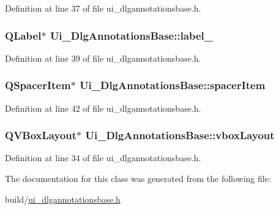 Definition at line 37 of file ui\+\_\+dlgannotationsbase.\+h.

\hypertarget{classUi__DlgAnnotationsBase_a7a9e0688f3997341881b6f05d0cee180}{
\subsubsection[{label\+\_\+2}]{\setlength{\rightskip}{0pt plus 5cm}Q\+Label$\ast$ Ui\+\_\+\+Dlg\+Annotations\+Base\+::label\+\_}}\label{classUi__DlgAnnotationsBase_a7a9e0688f3997341881b6f05d0cee180}


Definition at line 39 of file ui\+\_\+dlgannotationsbase.\+h.

\hypertarget{classUi__DlgAnnotationsBase_a8c085f70a0a6631a9ebec265195f89f0}{
\subsubsection[{spacer\+Item}]{\setlength{\rightskip}{0pt plus 5cm}Q\+Spacer\+Item$\ast$ Ui\+\_\+\+Dlg\+Annotations\+Base\+::spacer\+Item}}\label{classUi__DlgAnnotationsBase_a8c085f70a0a6631a9ebec265195f89f0}


Definition at line 42 of file ui\+\_\+dlgannotationsbase.\+h.

\hypertarget{classUi__DlgAnnotationsBase_a3cca923483f98ed4e4002f2449f2d493}{
\subsubsection[{vbox\+Layout}]{\setlength{\rightskip}{0pt plus 5cm}Q\+V\+Box\+Layout$\ast$ Ui\+\_\+\+Dlg\+Annotations\+Base\+::vbox\+Layout}}\label{classUi__DlgAnnotationsBase_a3cca923483f98ed4e4002f2449f2d493}


Definition at line 34 of file ui\+\_\+dlgannotationsbase.\+h.



The documentation for this class was generated from the following file\+:\begin{DoxyCompactItemize}
\item 
build/\hyperlink{ui__dlgannotationsbase_8h}{ui\+\_\+dlgannotationsbase.\+h}\end{DoxyCompactItemize}
